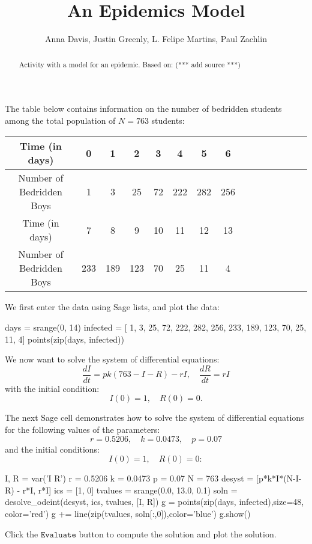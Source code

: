 \documentclass{ximera}
\title{An Epidemics Model}
\author{Anna Davis, Justin Greenly, L. Felipe Martins, Paul Zachlin}
\begin{document}
\begin{abstract}
Activity with a model for an epidemic. Based on: (*** add source ***)
\end{abstract}

\maketitle

The table below contains information on the number of bedridden students among the total population of $N=763$ students:

\begin{tabular}{|c|c|c|c|c|c|c|c|c|c|c|c|c|c|c|}\hline
Time (in days)           & 0 & 1 &  2 &  3 &  4 &    5 &   6  \\\hline
Number of Bedridden Boys & 1 & 3 & 25 & 72 & 222 & 282 & 256 \\\hline\hline
Time (in days) &             7 &   8 &   9 & 10 & 11 & 12 & 13\\\hline
Number of Bedridden Boys & 233 & 189 & 123 & 70 & 25 & 11 &  4\\\hline
\end{tabular}

We first enter the data using Sage lists, and plot the data:

\begin{sageCell}
days = srange(0, 14)
infected = [  1,   3,  25, 72, 222, 282, 256, 
            233, 189, 123, 70,  25,  11,   4]
points(zip(days, infected))
\end{sageCell}

We now want to solve the system of differential equations:
\[
\frac{dI}{dt}=pk(763-I-R)-rI,\quad\frac{dR}{dt}=rI
\]
with the initial condition:
\[
I(0)=1,\quad R(0)=0.
\]

The next Sage cell demonstrates how to solve the system of differential equations for the following values of the parameters:
\[
r = 0.5206,\quad k = 0.0473,\quad p = 0.07
\]
and the initial conditions:
\[
I(0)=1,\quad R(0)=0:
\]

\begin{sageCell}
I, R = var('I R')
r = 0.5206
k = 0.0473
p = 0.07
N = 763
desyst = [p*k*I*(N-I-R) - r*I, r*I]
ics = [1, 0]
tvalues = srange(0.0, 13.0, 0.1)
soln = desolve_odeint(desyst, ics, tvalues, [I, R])
g = points(zip(days, infected),size=48, color='red')
g += line(zip(tvalues, soln[:,0]),color='blue')
g.show()\end{sageCell}

Click the $\mathtt{Evaluate}$ button to compute the solution and plot the solution.
\end{document}
